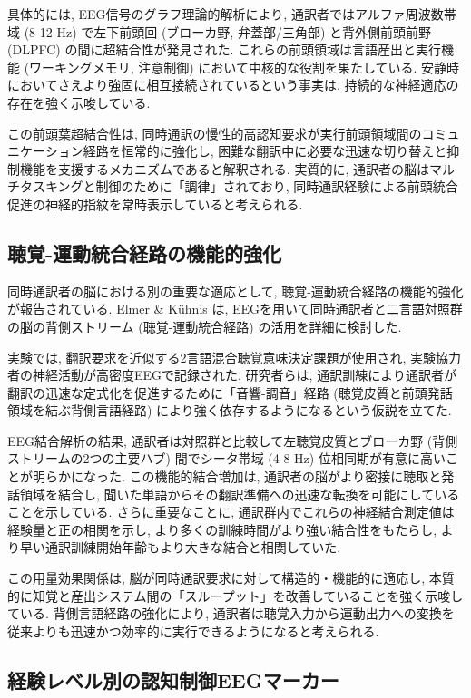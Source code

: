 具体的には, EEG信号のグラフ理論的解析により, 通訳者ではアルファ周波数帯域 (8-12 Hz) で左下前頭回 (ブローカ野, 弁蓋部/三角部) と背外側前頭前野 (DLPFC) の間に超結合性が発見された.
これらの前頭領域は言語産出と実行機能 (ワーキングメモリ, 注意制御) において中核的な役割を果たしている.
安静時においてさえより強固に相互接続されているという事実は, 持続的な神経適応の存在を強く示唆している.

この前頭葉超結合性は, 同時通訳の慢性的高認知要求が実行前頭領域間のコミュニケーション経路を恒常的に強化し, 困難な翻訳中に必要な迅速な切り替えと抑制機能を支援するメカニズムであると解釈される.
実質的に, 通訳者の脳はマルチタスキングと制御のために「調律」されており, 同時通訳経験による前頭統合促進の神経的指紋を常時表示していると考えられる.

\subsection{聴覚-運動統合経路の機能的強化}

同時通訳者の脳における別の重要な適応として, 聴覚-運動統合経路の機能的強化が報告されている.
Elmer & Kühnis \cite{elmer2016functional} は, EEGを用いて同時通訳者と二言語対照群の脳の背側ストリーム (聴覚-運動統合経路) の活用を詳細に検討した.

実験では, 翻訳要求を近似する2言語混合聴覚意味決定課題が使用され, 実験協力者の神経活動が高密度EEGで記録された.
研究者らは, 通訳訓練により通訳者が翻訳の迅速な定式化を促進するために「音響-調音」経路 (聴覚皮質と前頭発話領域を結ぶ背側言語経路) により強く依存するようになるという仮説を立てた.

EEG結合解析の結果, 通訳者は対照群と比較して左聴覚皮質とブローカ野 (背側ストリームの2つの主要ハブ) 間でシータ帯域 (4-8 Hz) 位相同期が有意に高いことが明らかになった.
この機能的結合増加は, 通訳者の脳がより密接に聴取と発話領域を結合し, 聞いた単語からその翻訳準備への迅速な転換を可能にしていることを示している.
さらに重要なことに, 通訳群内でこれらの神経結合測定値は経験量と正の相関を示し, より多くの訓練時間がより強い結合性をもたらし, より早い通訳訓練開始年齢もより大きな結合と相関していた.

この用量効果関係は, 脳が同時通訳要求に対して構造的・機能的に適応し, 本質的に知覚と産出システム間の「スループット」を改善していることを強く示唆している.
背側言語経路の強化により, 通訳者は聴覚入力から運動出力への変換を従来よりも迅速かつ効率的に実行できるようになると考えられる.

\subsection{経験レベル別の認知制御EEGマーカー}

